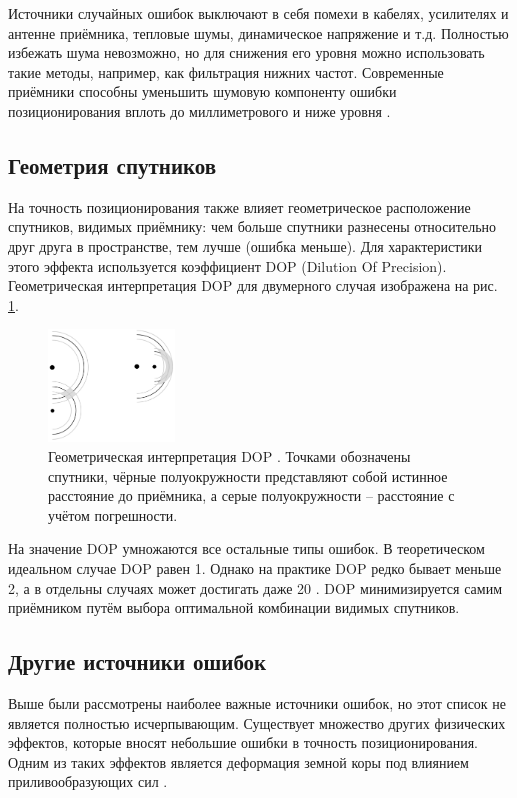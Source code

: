 Источники случайных ошибок выключают в себя помехи в кабелях, усилителях и антенне приёмника, тепловые шумы,  динамическое напряжение и т.д.
Полностью избежать шума невозможно, но для снижения его уровня можно использовать такие методы, например, как фильтрация нижних частот.
Современные приёмники способны уменьшить шумовую компоненту ошибки позиционирования вплоть до миллиметрового и ниже уровня \cite{Seeber2003}.

\subsection*{\textbf{Геометрия спутников}}

На точность позиционирования также влияет геометрическое расположение спутников, видимых приёмнику: чем больше спутники разнесены относительно друг друга в пространстве, тем лучше (ошибка меньше).
Для характеристики этого эффекта используется коэффициент DOP (Dilution Of Precision). 
Геометрическая интерпретация DOP для двумерного случая изображена на рис. \ref{fig-dop}. 
\begin{figure}[h]
\centering    
\includegraphics[width=0.3\textwidth]{fig/dop.png}    
\caption{Геометрическая интерпретация DOP \cite{Seeber2003}. Точками обозначены спутники, чёрные полуокружности представляют собой истинное расстояние до приёмника, а серые полуокружности -- расстояние с учётом погрешности.}
\label{fig-dop}      
\end{figure}

На значение DOP умножаются все остальные типы ошибок. 
В теоретическом идеальном случае DOP равен 1.
Однако на практике DOP редко бывает меньше 2, а в отдельны случаях может достигать даже 20 \cite{Sickle2001}.
DOP минимизируется самим приёмником путём выбора оптимальной комбинации видимых спутников.

\subsection*{\textbf{Другие источники ошибок}}

Выше были рассмотрены наиболее важные источники ошибок, но этот список не является полностью исчерпывающим.
Существует множество других физических эффектов, которые вносят небольшие ошибки в точность позиционирования.
Одним из таких эффектов является деформация земной коры под влиянием приливообразующих сил \cite{Subirana2013, Xu2007}. 